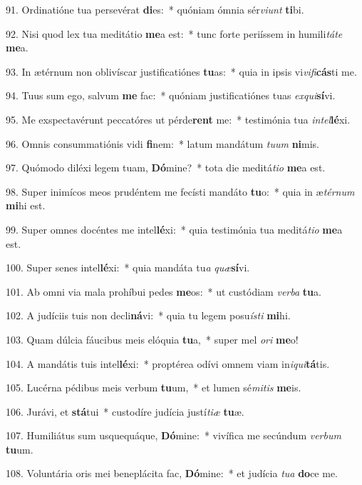 91. Ordinatióne tua persevérat \textbf{di}es:~*  quóniam ómnia sér\textit{vi}\textit{unt} \textbf{ti}bi.\

92. Nisi quod lex tua meditátio \textbf{me}a est:~*  tunc forte periíssem in humili\textit{tá}\textit{te} \textbf{me}a.\

93. In ætérnum non oblivíscar justificatiónes \textbf{tu}as:~*  quia in ipsis vi\textit{vi}\textit{fi}\textbf{cás}ti me.\

94. Tuus sum ego, salvum \textbf{me} fac:~*  quóniam justificatiónes tuas \textit{ex}\textit{qui}\textbf{sí}vi.\

95. Me exspectavérunt peccatóres ut pérde\textbf{rent} me:~*  testimónia tua \textit{in}\textit{tel}\textbf{lé}xi.\

96. Omnis consummatiónis vidi \textbf{fi}nem:~*  latum mandátum \textit{tu}\textit{um} \textbf{ni}mis.\

97. Quómodo diléxi legem tuam, \textbf{Dó}mine?~*  tota die meditá\textit{ti}\textit{o} \textbf{me}a est.\

98. Super inimícos meos prudéntem me fecísti mandáto \textbf{tu}o:~*  quia in æ\textit{tér}\textit{num} \textbf{mi}hi est.\

99. Super omnes docéntes me intel\textbf{lé}xi:~*  quia testimónia tua meditá\textit{ti}\textit{o} \textbf{me}a est.\

100. Super senes intel\textbf{lé}xi:~*  quia mandáta tu\textit{a} \textit{quæ}\textbf{sí}vi.\

101. Ab omni via mala prohíbui pedes \textbf{me}os:~*  ut custódiam \textit{ver}\textit{ba} \textbf{tu}a.\

102. A judíciis tuis non decli\textbf{ná}vi:~*  quia tu legem posu\textit{ís}\textit{ti} \textbf{mi}hi.\

103. Quam dúlcia fáucibus meis elóquia \textbf{tu}a,~*  super mel \textit{o}\textit{ri} \textbf{me}o!\

104. A mandátis tuis intel\textbf{lé}xi:~*  proptérea odívi omnem viam in\textit{i}\textit{qui}\textbf{tá}tis.\

105. Lucérna pédibus meis verbum \textbf{tu}um,~*  et lumen sé\textit{mi}\textit{tis} \textbf{me}is.\

106. Jurávi, et \textbf{stá}tui~*  custodíre judícia justí\textit{ti}\textit{æ} \textbf{tu}æ.\

107. Humiliátus sum usquequáque, \textbf{Dó}mine:~*  vivífica me secúndum \textit{ver}\textit{bum} \textbf{tu}um.\

108. Voluntária oris mei beneplácita fac, \textbf{Dó}mine:~*  et judícia \textit{tu}\textit{a} \textbf{do}ce me.\

